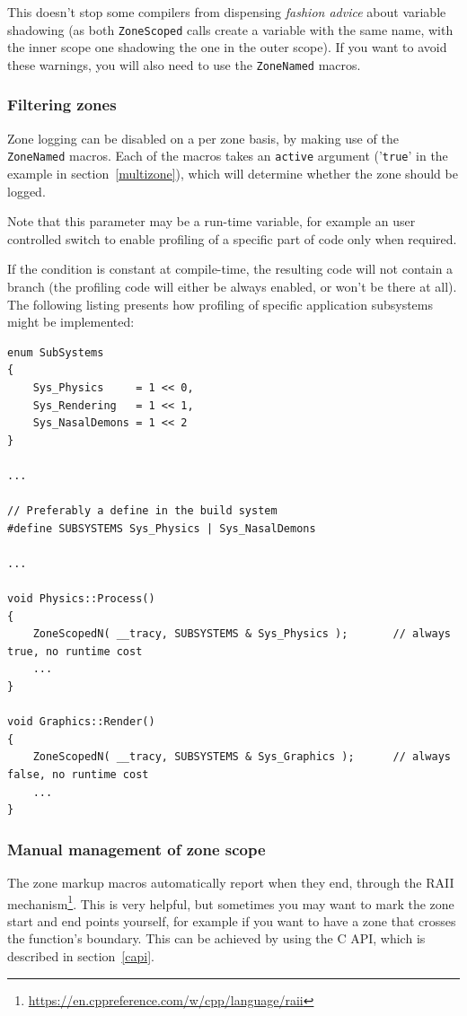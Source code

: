 \documentclass[hidelinks,titlepage,a4paper]{article}
\begin{document}
This doesn't stop some compilers from dispensing \emph{fashion advice} about variable shadowing (as both \texttt{ZoneScoped} calls create a variable with the same name, with the inner scope one shadowing the one in the outer scope). If you want to avoid these warnings, you will also need to use the \texttt{ZoneNamed} macros.

\subsubsection{Filtering zones}
\label{filteringzones}

Zone logging can be disabled on a per zone basis, by making use of the \texttt{ZoneNamed} macros. Each of the macros takes an \texttt{active} argument ('\texttt{true}' in the example in section~\ref{multizone}), which will determine whether the zone should be logged.

Note that this parameter may be a run-time variable, for example an user controlled switch to enable profiling of a specific part of code only when required.

If the condition is constant at compile-time, the resulting code will not contain a branch (the profiling code will either be always enabled, or won't be there at all). The following listing presents how profiling of specific application subsystems might be implemented:

\begin{lstlisting}
enum SubSystems
{
	Sys_Physics		= 1 << 0,
	Sys_Rendering	= 1 << 1,
	Sys_NasalDemons	= 1 << 2
}

...

// Preferably a define in the build system
#define SUBSYSTEMS Sys_Physics | Sys_NasalDemons

...

void Physics::Process()
{
	ZoneScopedN( __tracy, SUBSYSTEMS & Sys_Physics );		// always true, no runtime cost
	...
}

void Graphics::Render()
{
	ZoneScopedN( __tracy, SUBSYSTEMS & Sys_Graphics );		// always false, no runtime cost
	...
}
\end{lstlisting}

\subsubsection{Manual management of zone scope}

The zone markup macros automatically report when they end, through the RAII mechanism\footnote{\url{https://en.cppreference.com/w/cpp/language/raii}}. This is very helpful, but sometimes you may want to mark the zone start and end points yourself, for example if you want to have a zone that crosses the function's boundary. This can be achieved by using the C API, which is described in section~\ref{capi}.
\end{document}
